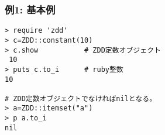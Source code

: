 \subsubsection*{例1: 基本例}



\begin{Verbatim}[baselinestretch=0.7,frame=single]
> require 'zdd'
> c=ZDD::constant(10)
> c.show           # ZDD定数オブジェクト
 10
> puts c.to_i      # ruby整数
10

# ZDD定数オブジェクトでなければnilとなる。
> a=ZDD::itemset("a")
> p a.to_i
nil
\end{Verbatim}
